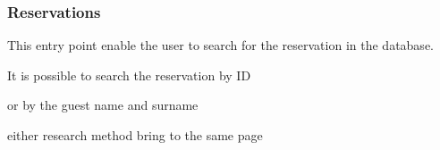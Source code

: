\subsubsection{Reservations}

This entry point enable the user to search for the reservation in the database.

It is possible to search the reservation by ID


or by the guest name and surname


either research method bring to the same page


